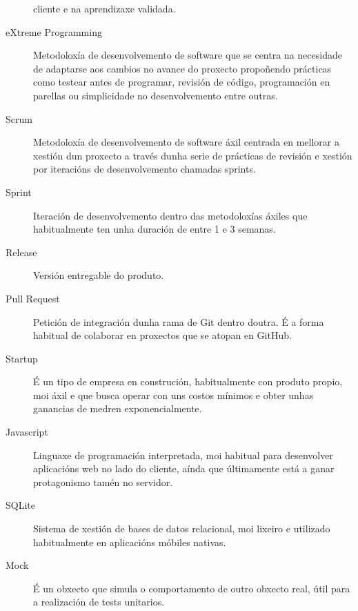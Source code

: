 \begin{description}
cliente e na aprendizaxe validada.
 \item [eXtreme Programming] Metodoloxía de desenvolvemento de software que se 
centra na necesidade de adaptarse aos cambios no avance do proxecto propoñendo 
prácticas como testear antes de programar, revisión de código, programación en 
parellas ou simplicidade no desenvolvemento entre outras.
 \item [Scrum] Metodoloxía de desenvolvemento de software áxil centrada en 
mellorar a xestión dun proxecto a través dunha serie de prácticas de revisión 
e xestión por iteracións de desenvolvemento chamadas sprints.
 \item [Sprint] Iteración de desenvolvemento dentro das metodoloxías áxiles que 
habitualmente ten unha duración de entre 1 e 3 semanas.
 \item [Release] Versión entregable do produto.
 \item [Pull Request] Petición de integración dunha rama de Git dentro doutra. É 
a forma habitual de colaborar en proxectos que se atopan en GitHub.
 \item [Startup] É un tipo de empresa en construción, habitualmente con 
produto propio, moi áxil e que busca operar con uns costos mínimos e obter 
unhas ganancias de medren exponencialmente.
 \item [Javascript] Linguaxe de programación interpretada, moi habitual para 
desenvolver aplicacións web no lado do cliente, aínda que últimamente está a 
ganar protagonismo tamén no servidor.
 \item [SQLite] Sistema de xestión de bases de datos relacional, moi lixeiro e 
utilizado habitualmente en aplicacións móbiles nativas.
 \item [Mock] É un obxecto que simula o comportamento de outro obxecto real, 
útil para a realización de tests unitarios.
\end{description}
